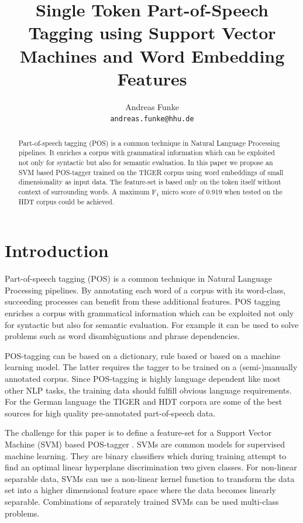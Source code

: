 \documentclass[11pt,a4paper]{article}
\title{Single Token Part-of-Speech Tagging using Support Vector Machines and Word Embedding Features}
\author{Andreas Funke \\
  {\tt andreas.funke@hhu.de} \\
}
\date{}
\begin{document}
\maketitle
\begin{abstract}
Part-of-speech tagging (POS) is a common technique in Natural Language Processing pipelines. It enriches a corpus with grammatical information which can be exploited not only for syntactic but also for semantic evaluation. In this paper we propose an SVM based POS-tagger trained on the TIGER corpus using word embeddings of small dimensionality as input data. The feature-set is based only on the token itself without context of surrounding words. A maximum F$_1$ micro score of 0.919 when tested on the HDT corpus could be achieved.

\end{abstract}



\section{Introduction}
Part-of-speech tagging (POS) is a common technique in Natural Language Processing pipelines. By annotating each word of a corpus with its word-class, succeeding processes can benefit from these additional features. POS tagging enriches a corpus with grammatical information which can be exploited not only for syntactic but also for semantic evaluation. For example it can be used to solve problems such as word disambiguations and phrase dependencies.

POS-tagging can be based on a dictionary, rule based or based on a machine learning model. The latter requires the tagger to be trained on a (semi-)manually annotated corpus. Since POS-tagging is highly language dependent like most other NLP tasks, the training data should fulfill obvious language requirements. For the German language the TIGER \cite{Brants2004} and HDT \cite{Foth14} corpora are some of the best sources for high quality pre-annotated part-of-speech data.

The challenge for this paper is to define a feature-set for a Support Vector Machine (SVM) based POS-tagger \cite{nakagawa2001unknown}. SVMs are common models for supervised machine learning. They are binary classifiers which during training attempt to find an optimal linear hyperplane discrimination two given classes. For non-linear separable data, SVMs can use a non-linear kernel function to transform the data set into a higher dimensional feature space where the data becomes linearly separable. Combinations of separately trained SVMs can be used multi-class problems.
\end{document}
